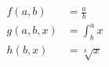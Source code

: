 \begin{align*}
    f(a, b) &= \frac{a}{b} \\
    g(a, b, x) &= \int^a_b x \\
    h(b, x) &= \sqrt[b]{x}
\end{align*}
